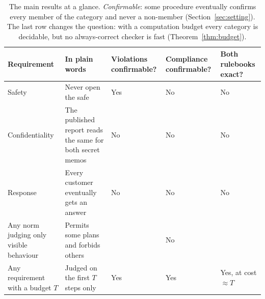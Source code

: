 \begin{table}[t]
  \centering\small
  \caption{The main results at a glance. \emph{Confirmable}: some procedure eventually confirms every member of the category and never a non-member (Section~\ref{sec:setting}). The last row changes the question: with a computation budget every category is decidable, but no always-correct checker is fast (Theorem~\ref{thm:budget}).}
  \label{tab:glance}
  \begin{tabularx}{\textwidth}{@{}>{\raggedright\arraybackslash}p{2.6cm}Y>{\centering\arraybackslash}p{2.3cm}>{\centering\arraybackslash}p{2.3cm}>{\centering\arraybackslash}p{2.3cm}@{}}
    \toprule
    Requirement & In plain words & Violations confirmable? & Compliance confirmable? & Both rulebooks exact?\\
    \midrule
    Safety & Never open the safe & Yes & No & No\\
    Confidentiality & The published report reads the same for both secret memos & No & No & No\\
    Response & Every customer eventually gets an answer & No & No & No\\
    \midrule
    Any norm judging only visible behaviour & Permits some plans and forbids others &  & No\\
    \midrule
    Any requirement with a budget $T$ & Judged on the first $T$ steps only & Yes & Yes & Yes, at cost $\approx T$\\
    \bottomrule
  \end{tabularx}
\end{table}

